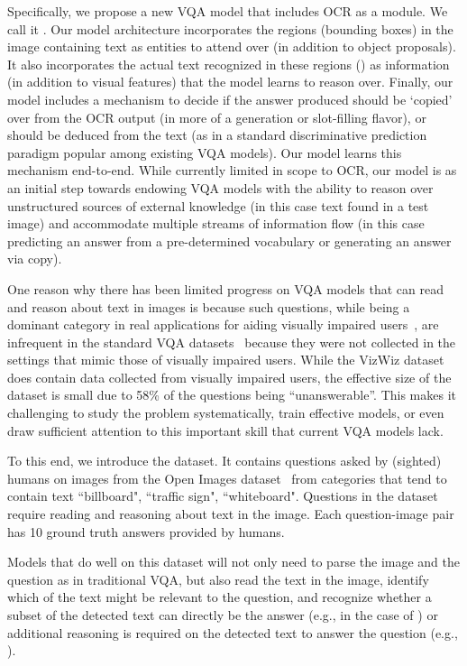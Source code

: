 \documentclass[10pt,twocolumn,letterpaper]{article}
\begin{document}
Specifically, we propose a new VQA model that includes OCR as a module. We call it \approachName. Our model architecture incorporates the regions (bounding boxes) in the image containing text as entities to attend over (in addition to object proposals). It also incorporates the actual text  recognized in these regions 
(\eg {}) 
as information (in addition to visual features) that the model learns to reason over. Finally, our model includes a mechanism to decide if the answer produced should be `copied' over from the OCR output (in more of a generation or slot-filling flavor), or should be deduced from the text (as in a standard discriminative prediction paradigm popular among existing VQA models). Our model learns this mechanism end-to-end. While currently limited in scope to OCR, our model is as an initial step towards endowing VQA models with the ability to reason over unstructured sources of external knowledge (in this case text found in a test image) and accommodate multiple streams of information flow (in this case predicting an answer from a pre-determined vocabulary or generating an answer via copy). 

One reason why there has been limited progress on VQA models that can read and reason about text in images is because such questions, while being a dominant category in real applications for aiding visually impaired users~\cite{bigham2010vizwiz}, are infrequent 
in the standard VQA datasets~\cite{antol2015vqa, balanced_vqa_v2, zhu2016visual7w} because they were not collected in the settings that mimic those of visually impaired users.
While the VizWiz dataset~\cite{gurari2018vizwiz} does contain data collected from visually impaired users,
the effective size of the dataset is small due to 58\% of the questions being ``unanswerable''. 
This makes it challenging to study the problem systematically, train effective models, or even draw sufficient attention to this important skill that current VQA models lack. 

To this end, we introduce the \datasetName dataset. It contains \datasetNQuestions{} questions asked by (sighted) humans on \datasetNImages{} images from the Open Images dataset~\cite{krasin2016openimages} from categories that tend to contain text \eg ``billboard", ``traffic sign", ``whiteboard". 
Questions in the dataset require reading and reasoning about text in the image. Each question-image pair has 
10 ground truth answers provided by humans. 

Models that do well on this dataset will not only need to parse the image and the question as in traditional VQA, but also read the text in the image, identify which of the text might be relevant to the question, and recognize whether a subset of the detected text can directly be the answer (e.g., in the case of ) or additional reasoning is required on the detected text to answer the question (e.g., ).
\end{document}
